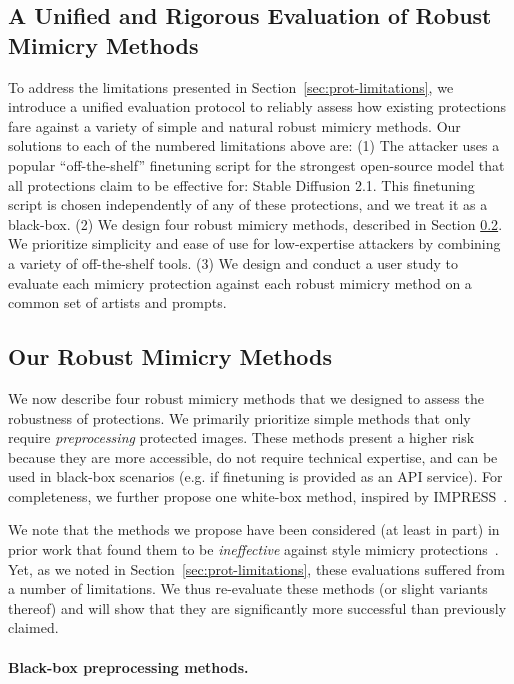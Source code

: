 \documentclass{article}
\begin{document}
\subsection{A Unified and Rigorous Evaluation of Robust Mimicry Methods}
To address the limitations presented in Section~\ref{sec:prot-limitations}, we introduce a unified evaluation protocol to reliably assess how existing protections fare against a variety of simple and natural robust mimicry methods. Our solutions to each of the numbered limitations above are: (1) The attacker uses a popular ``off-the-shelf'' finetuning script for the strongest open-source model that all protections claim to be effective for: Stable Diffusion 2.1. This finetuning script is chosen independently of any of these protections, and we treat it as a black-box. (2) We design four robust mimicry methods, described in Section \ref{sec:our-methods}. We prioritize simplicity and ease of use for low-expertise attackers by combining a variety of off-the-shelf tools. (3) We design and conduct a user study to evaluate each mimicry protection against each robust mimicry method on a common set of artists and prompts.


\subsection{Our Robust Mimicry Methods}
\label{sec:our-methods}


We now describe four robust mimicry methods that we designed to assess the robustness of protections. We primarily prioritize simple methods that only require \emph{preprocessing} protected images. These methods present a higher risk because they are more accessible, do not require technical expertise, and can be used in black-box scenarios (e.g. if finetuning is provided as an API service). For completeness, we further propose one white-box method, inspired by IMPRESS~\citep{impress}.

We note that the methods we propose have been considered (at least in part) in prior work that found them to be \emph{ineffective} against style mimicry protections~\citep{glaze, mist, glazeresponsetoimpress}. Yet, as we noted in Section~\ref{sec:prot-limitations}, these evaluations suffered from a number of limitations. We thus re-evaluate these methods (or slight variants thereof) and will show that they are significantly more successful than previously claimed.

\paragraph{Black-box preprocessing methods.}\hspace{0.3em}
\end{document}
